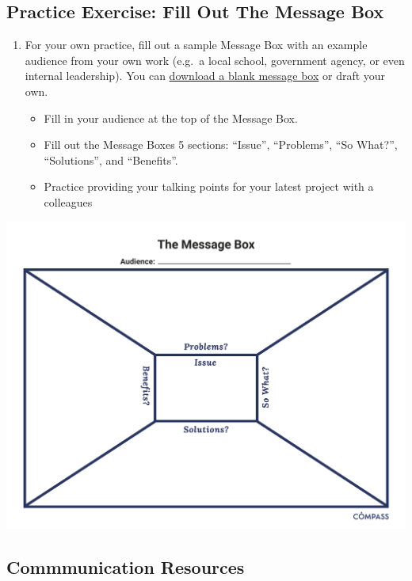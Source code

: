 \documentclass[
]{book}
\providecommand{\tightlist}{%
  \setlength{\itemsep}{0pt}\setlength{\parskip}{0pt}}
\begin{document}
\hypertarget{practice-exercise-fill-out-the-message-box}{%
\subsection{Practice Exercise: Fill Out The Message Box}\label{practice-exercise-fill-out-the-message-box}}

\begin{enumerate}
\def\labelenumi{\arabic{enumi}.}
\item
  For your own practice, fill out a sample Message Box with an example audience from your own work (e.g.~a local school, government agency, or even internal leadership). You can \href{files/Message-Box-Blank.pdf}{download a blank message box} or draft your own.

  \begin{itemize}
  \tightlist
  \item
    Fill in your audience at the top of the Message Box.
  \item
    Fill out the Message Boxes 5 sections: ``Issue'', ``Problems'', ``So What?'', ``Solutions'', and ``Benefits''.
  \item
    Practice providing your talking points for your latest project with a colleagues
  \end{itemize}
\end{enumerate}

\includegraphics{images/message-box-blank.png}

\hypertarget{commmunication-resources}{%
\subsection{Commmunication Resources}\label{commmunication-resources}}
\end{document}
